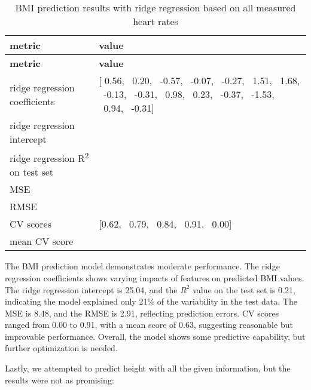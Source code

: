 \begin{table}[H]
\begin{longtable}{|>{\raggedright}p{4cm}|>{\raggedright\arraybackslash}p{10cm}|}
\hline
\textbf{metric} & \textbf{value} \\
\hline
\endfirsthead
\hline
\textbf{metric} & \textbf{value} \\
\hline
\endhead
\hline
\endfoot
ridge regression coefficients & 
\begin{minipage}[t]{10cm}
[ 0.56, \  0.20, \  -0.57, \ -0.07, \ -0.27, \  1.51, \  1.68, \ -0.13, \ -0.31, \  0.98, \  0.23, \ -0.37, \ -1.53, \  0.94, \ -0.31]
\end{minipage}
\\
\hline
ridge regression intercept & 25.04 \\
\hline
ridge regression R\textsuperscript{2} on test set & 0.21\\
\hline
MSE & 8.48 \\
\hline
RMSE & 2.91 \\
\hline
CV scores & 
\begin{minipage}[t]{10cm}
[0.62, \ 0.79, \ 0.84, \ 0.91, \ 0.00]
\end{minipage}
\\
\hline
mean CV score & 0.63 \\
\hline
\end{longtable}
\caption{BMI prediction results with ridge regression based on all measured heart rates}
\label{tab:RRBMIallheart}
\end{table}

The BMI prediction model demonstrates moderate performance. The ridge regression coefficients shows varying impacts of features on predicted BMI values. The ridge regression intercept is 25.04, and the \( R^2 \) value on the test set is 0.21, indicating the model explained only 21\% of the variability in the test data. The MSE is 8.48, and the RMSE is 2.91, reflecting prediction errors. CV scores ranged from 0.00 to 0.91, with a mean score of 0.63, suggesting reasonable but improvable performance. Overall, the model shows some predictive capability, but further optimization is needed.

Lastly, we attempted to predict height with all the given information, but the results were not as promising:

